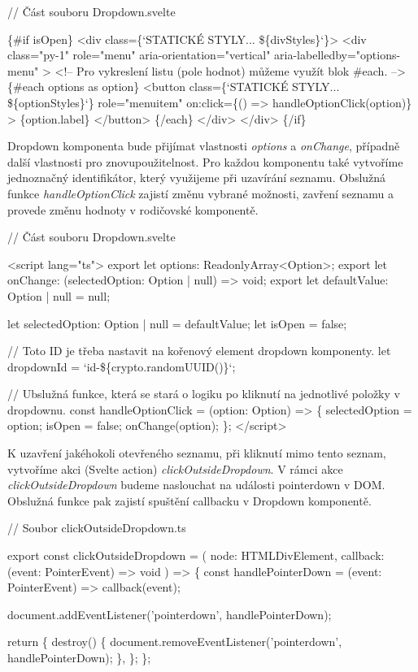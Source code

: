 \begin{prog}
// Část souboru Dropdown.svelte

\{#if isOpen\}
  <div class=\{`STATICKÉ STYLY... \$\{divStyles\}`\}>
    <div 
      class="py-1" role="menu" 
      aria-orientation="vertical" aria-labelledby="options-menu"
    >
      <!-- Pro vykreslení listu (pole hodnot) můžeme využít blok #each. -->
      \{#each options as option\}
        <button
          class=\{`STATICKÉ STYLY... \$\{optionStyles\}`\}
          role="menuitem"
          on:click=\{() => handleOptionClick(option)\}
        >
          \{option.label\}
        </button>
      \{/each\}
    </div>
  </div>
\{/if\}
\end{prog}

Dropdown komponenta bude přijímat vlastnosti \emph{options} a \emph{onChange}, případně další vlastnosti pro znovupoužitelnost. Pro každou komponentu také vytvoříme jednoznačný identifikátor, který využijeme při uzavírání seznamu.
Obslužná funkce \emph{handleOptionClick} zajistí změnu vybrané možnosti, zavření seznamu a provede změnu hodnoty v rodičovské komponentě. 

\begin{prog}
// Část souboru Dropdown.svelte
  
<script lang="ts">
  export let options: ReadonlyArray<Option>;
  export let onChange: (selectedOption: Option | null) => void;
  export let defaultValue: Option | null = null;

  let selectedOption: Option | null = defaultValue;
  let isOpen = false;

  // Toto ID je třeba nastavit na kořenový element dropdown komponenty.
  let dropdownId = `id-\$\{crypto.randomUUID()\}`;

  // Ubslužná funkce, která se stará o logiku 
    po kliknutí na jednotlivé položky v dropdownu.
  const handleOptionClick = (option: Option) => \{
    selectedOption = option;
    isOpen = false;
    onChange(option);
  \};
</script>
\end{prog}

K uzavření jakéhokoli otevřeného seznamu, při kliknutí mimo tento seznam, vytvoříme akci (Svelte action) \emph{clickOutsideDropdown}. 
V rámci akce \emph{clickOutsideDropdown} budeme naslouchat na události pointerdown v DOM. Obslužná funkce pak zajistí spuštění callbacku v Dropdown komponentě.

\begin{prog}
// Soubor clickOutsideDropdown.ts

export const clickOutsideDropdown = (
  node: HTMLDivElement,
  callback: (event: PointerEvent) => void
) => \{
  const handlePointerDown = (event: PointerEvent) => callback(event);

  document.addEventListener('pointerdown', handlePointerDown);

  return \{
    destroy() \{
      document.removeEventListener('pointerdown', handlePointerDown);
    \},
  \};
\};
\end{prog}

